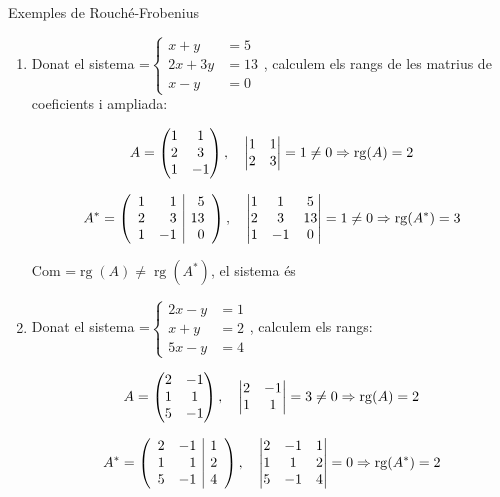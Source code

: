 \documentclass[11pt,a4paper]{article}
\newcommand{\fmm}[1]{\setbox0=\hbox{$#1$}\ifdim\wd0>\linewidth\fmdisp{#1}\else\mbox{\box0}\fi}
\newcommand{\fmdisp}[1]{\[\setbox2=\hbox{$\displaystyle #1$}\ifdim\wd2>\linewidth\resizebox{\linewidth}{!}{\box2}\else\box2\fi\]}
\newcommand{\fmbadge}[2]{\tcbox[on line,colback=#1,colframe=#1,arc=2mm,boxsep=0pt,left=4pt,right=4pt,top=1.5pt,bottom=1.5pt]{\color{white}\footnotesize\bfseries #2}}
\begin{document}
\begin{fmex}{Exemples de Rouché-Frobenius}
\begin{enumerate}[label=\textbf{\arabic*.},leftmargin=*]
\item Donat el sistema \fmm{\left\{\begin{aligned}x+y&=5\\ 2x+3y&=13\\ x-y&=0\end{aligned}\right.}, calculem els rangs de les matrius de coeficients i ampliada:

\fmdisp{A=\begin{pmatrix}1 & 1\\ 2 & 3\\ 1 & -1\end{pmatrix},\quad\begin{vmatrix}1 & 1\\ 2 & 3\end{vmatrix}=1\neq0\Rightarrow\operatorname{rg}(A)=2}

\fmdisp{A^*=\left(\begin{array}{rr|r}1 & 1 & 5\\ 2 & 3 & 13\\ 1 & -1 & 0\end{array}\right),\quad\begin{vmatrix}1 & 1 & 5\\ 2 & 3 & 13\\ 1 & -1 & 0\end{vmatrix}=1\neq0\Rightarrow\operatorname{rg}(A^*)=3}

Com \fmm{\operatorname{rg}(A)\neq\operatorname{rg}(A^*)}, el sistema és \fmbadge{fmsi}{SI}
\item Donat el sistema \fmm{\left\{\begin{aligned}2x-y&=1\\ x+y&=2\\ 5x-y&=4\end{aligned}\right.}, calculem els rangs:

\fmdisp{A=\begin{pmatrix}2 & -1\\ 1 & 1\\ 5 & -1\end{pmatrix},\quad\begin{vmatrix}2 & -1\\ 1 & 1\end{vmatrix}=3\neq0\Rightarrow\operatorname{rg}(A)=2}

\fmdisp{A^*=\left(\begin{array}{rr|r}2 & -1 & 1\\ 1 & 1 & 2\\ 5 & -1 & 4\end{array}\right),\quad\begin{vmatrix}2 & -1 & 1\\ 1 & 1 & 2\\ 5 & -1 & 4\end{vmatrix}=0\Rightarrow\operatorname{rg}(A^*)=2}


\end{enumerate}
\end{fmex}
\end{document}
